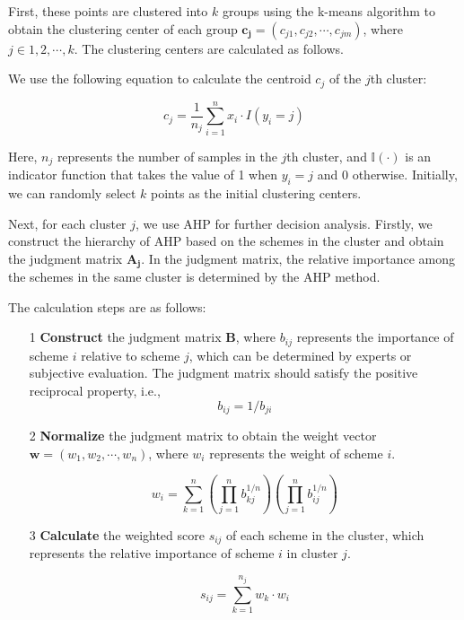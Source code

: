 First, these points are clustered into $k$ groups using the k-means algorithm to obtain the clustering center of each group $\boldsymbol{c_j}=(c_{j1},c_{j2},\cdots,c_{jm})$, where $j\in{1,2,\cdots,k}$. The clustering centers are calculated as follows.

We use the following equation to calculate the centroid $c_j$ of the $j$th cluster:

\begin{equation}
c_j = \frac{1}{n_j} \sum\limits_{i=1}^{n} x_i \cdot I(y_i=j)
\end{equation}

Here, $n_j$ represents the number of samples in the $j$th cluster, and $\mathbb{I}(\cdot)$ is an indicator function that takes the value of 1 when $y_i=j$ and 0 otherwise. Initially, we can randomly select $k$ points as the initial clustering centers.

Next, for each cluster $j$, we use AHP for further decision analysis. Firstly, we construct the hierarchy of AHP based on the schemes in the cluster and obtain the judgment matrix $\boldsymbol{A_j}$. In the judgment matrix, the relative importance among the schemes in the same cluster is determined by the AHP method.

The calculation steps are as follows:

\begin{itemize}
\item[1] \textbf{Construct} the judgment matrix $\boldsymbol{B}$, where $b_{ij}$ represents the importance of scheme $i$ relative to scheme $j$, which can be determined by experts or subjective evaluation. The judgment matrix should satisfy the positive reciprocal property, i.e.,
    \begin{equation}
        b_{ij}=1/b_{ji}
    \end{equation}

\item[2] \textbf{Normalize} the judgment matrix to obtain the weight vector $\boldsymbol{w}=(w_1,w_2,\cdots,w_n)$, where $w_i$ represents the weight of scheme $i$.

    \begin{equation}
        w_i = \sum_{k=1}^n \left(\prod_{j=1}^n b_{kj}^{1/n}\right)\left(\prod_{j=1}^n b_{ij}^{1/n}\right)
    \end{equation}

\item[3] \textbf{Calculate} the weighted score $s_{ij}$ of each scheme in the cluster, which represents the relative importance of scheme $i$ in cluster $j$.

    \begin{equation}
        s_{ij} = \sum\limits_{k=1}^{n_j} w_k \cdot w_i
    \end{equation}
\end{itemize}

